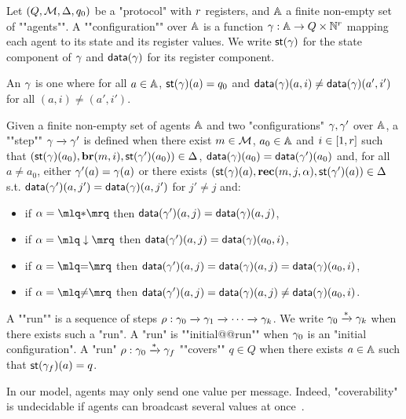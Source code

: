 \begin{definition}[Semantics]
	Let $(Q,\mathcal{M}, \Delta, q_0)$ be a "protocol" with $r$ registers, and $\mathbb{A}$ a finite non-empty set of ""agents"".
	A ""configuration"" over $\mathbb{A}$ is a function $\gamma : \mathbb{A} \to Q \times \mathbb{N}^{r}$ mapping each agent to its state and its register values. 
	We write $\mathsf{st}(\gamma)$ for the state component of $\gamma$ and $\mathsf{data}(\gamma)$ for its register component.
	
	\AP An  $\gamma$ is one where for all $a \in \mathbb{A}$, $\mathsf{st}(\gamma)(a) = q_0$ and $\mathsf{data}(\gamma)(a, i) \neq \mathsf{data}(\gamma)(a', i')$ for all $(a,i) \neq (a', i')$.
	
	\AP Given a finite non-empty set of agents $\mathbb{A}$ and two "configurations" $\gamma, \gamma'$ over $\mathbb{A}$, a ""step"" $\gamma \xrightarrow{} \gamma'$ is defined when there exist $m \in \mathcal{M}$, $a_0 \in \mathbb{A}$ and $i \in [1,r]$ such that \linebreak $(\mathsf{st}(\gamma)(a_0),\textbf{br}(m, i), \mathsf{st}(\gamma')(a_0)) \in \Delta$, $\mathsf{data}(\gamma)(a_0) = \mathsf{data}(\gamma')(a_0)$ and, for all $a \ne a_0$, either $\gamma'(a) = \gamma(a)$ or there exists $(\mathsf{st}(\gamma)(a),\textbf{rec}(m, j, \alpha),\mathsf{st}(\gamma')(a)) \in \Delta$
		s.t. $\mathsf{data}(\gamma')(a, j') = \mathsf{data}(\gamma)(a, j')$ for $j' \neq j$ and:
		\begin{itemize}
				\item if $\anact = \quotemarks{\dummyact}$ 
				then $\mathsf{data}(\gamma')(a,j) = \mathsf{data}(\gamma)(a,j)$,
				\item if $\anact = \quotemarks{\enregact}$ then $\mathsf{data}(\gamma')(a,j) = \mathsf{data}(\gamma)(a_0,i)$,
				\item if $\anact = \quotemarks{\eqtestact}$ then $\mathsf{data}(\gamma')(a,j) = \mathsf{data}(\gamma)(a,j) =\mathsf{data}(\gamma)(a_0,i)$,
				\item if $\anact = \quotemarks{\diseqtestact}$ then $\mathsf{data}(\gamma')(a,j) = \mathsf{data}(\gamma)(a,j) \ne \mathsf{data}(\gamma)(a_0,i)$.
			\end{itemize}
	
	\AP A ""run"" is a sequence of steps $\rho : \gamma_0 \xrightarrow{} \gamma_1 \xrightarrow{} \cdots \xrightarrow{} \gamma_k$. 
	We write $\gamma_0 \xrightarrow{*} \gamma_k$ when there exists such a "run".
	A "run" is ""initial@@run"" when $\gamma_0$ is an "initial configuration".  
	A "run" $\rho: \gamma_0 \xrightarrow{*} \gamma_f$ ""covers"" $q \in Q$ when there exists $a \in \mathbb{A}$ such that $\mathsf{st}(\gamma_f)(a) = q$. 
\end{definition}
\begin{remark}
\label{rem:several_values_per_message}
In our model, agents may only send one value per message. Indeed, "coverability" is undecidable if agents can broadcast several values at once~\cite{DelzannoST13}. 
\end{remark}

